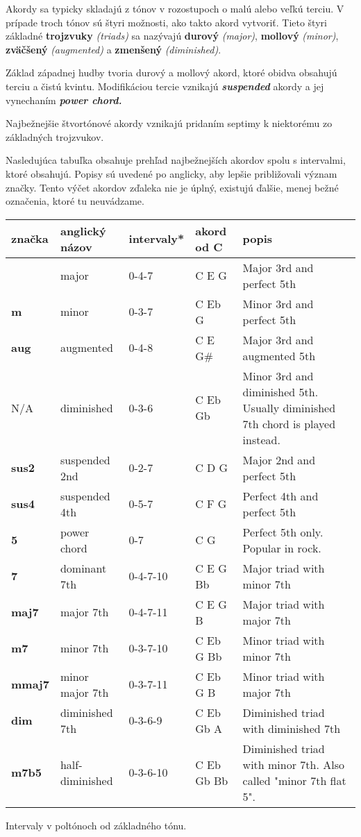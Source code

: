 \begin{center}
 \quad {}
\end{center}

Akordy sa typicky skladajú z tónov v rozostupoch o malú alebo veľkú terciu. V prípade troch tónov sú štyri možnosti,
ako takto akord vytvoriť. Tieto štyri základné \textbf{trojzvuky} \textit{(triads)} sa nazývajú
\textbf{durový} \textit{(major)}, \textbf{mollový} \textit{(minor)}, \textbf{zväčšený} \textit{(augmented)}
a \textbf{zmenšený} \textit{(diminished)}.

Základ západnej hudby tvoria durový a mollový akord, ktoré obidva obsahujú terciu a čistú kvintu. Modifikáciou
tercie vznikajú \textbf{\textit{suspended}} akordy a jej vynechaním \textbf{\textit{power chord.}}

Najbežnejšie štvortónové akordy vznikajú pridaním septimy k niektorému zo základných trojzvukov.

Nasledujúca tabuľka obsahuje prehľad najbežnejších akordov spolu s intervalmi, ktoré obsahujú.
Popisy sú uvedené po anglicky, aby lepšie približovali význam značky. Tento výčet akordov zďaleka
nie je úplný, existujú ďalšie, menej bežné označenia, ktoré tu neuvádzame.

{\smaller
\begin{tabularx}{\linewidth}{ l l l l X }
    značka & anglický názov & intervaly* & akord od C & popis \\
    \hline
      & major & 0-4-7 & C E G & Major 3rd and perfect 5th \\
    \textbf{m} & minor & 0-3-7 & C Eb G & Minor 3rd and perfect 5th \\
    \textbf{aug} & augmented & 0-4-8 & C E G\# & Major 3rd and augmented 5th \\
    N/A & diminished & 0-3-6 & C Eb Gb & Minor 3rd and diminished 5th. Usually diminished 7th chord is played instead. \\
    \hline
    \textbf{sus2} & suspended 2nd & 0-2-7 & C D G & Major 2nd and perfect 5th  \\
    \textbf{sus4} & suspended 4th & 0-5-7 & C F G & Perfect 4th and perfect 5th \\
    \textbf{5} & power chord & 0-7 & C G & Perfect 5th only. Popular in rock. \\
    \hline
    \textbf{7} & dominant 7th &  0-4-7-10 & C E G Bb & Major triad with minor 7th  \\
    \textbf{maj7} & major 7th &  0-4-7-11 & C E G B & Major triad with major 7th \\
    \textbf{m7} & minor 7th &  0-3-7-10 & C Eb G Bb & Minor triad with minor 7th \\
    \textbf{mmaj7} & minor major 7th &  0-3-7-11 & C Eb G B & Minor triad with major 7th \\
    \textbf{dim} & diminished 7th &  0-3-6-9 & C Eb Gb A & Diminished triad with diminished 7th \\
    \textbf{m7b5} & half-diminished &  0-3-6-10 & C Eb Gb Bb & Diminished triad with minor 7th. Also called "minor 7th flat 5". \\
\end{tabularx}
}
{\smaller *Intervaly v poltónoch od základného tónu.}

